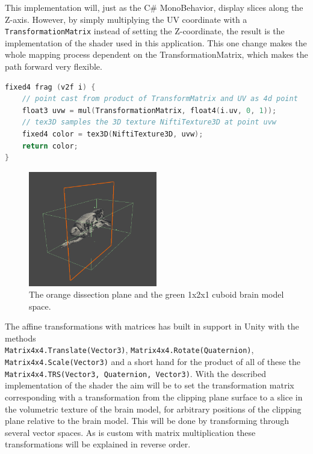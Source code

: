 This implementation will, just as the C\# MonoBehavior, display slices along the Z-axis. However, by simply multiplying the UV coordinate with a \texttt{TransformationMatrix} instead of setting the Z-coordinate, the result is the implementation of the shader used in this application. This one change makes the whole mapping process dependent on the TransformationMatrix, which makes the path forward very flexible.

\begin{lstlisting}[language=c]
fixed4 frag (v2f i) {
    // point cast from product of TransformMatrix and UV as 4d point
    float3 uvw = mul(TransformationMatrix, float4(i.uv, 0, 1));
    // tex3D samples the 3D texture NiftiTexture3D at point uvw
    fixed4 color = tex3D(NiftiTexture3D, uvw);
    return color;
}
\end{lstlisting}
\begin{figure}[ht]
    \centering
    \includegraphics[width=0.5\textwidth]{fig/dissection_boxplaneview.png}
    \caption{The orange dissection plane and the green 1x2x1 cuboid brain model space.}
    \label{fig:boxandplanedissect}
\end{figure}

The affine transformations with matrices has built in support in Unity with the methods\\ \texttt{Matrix4x4.Translate(Vector3)}, \texttt{Matrix4x4.Rotate(Quaternion)}, \texttt{Matrix4x4.Scale(Vector3)} and a short hand for the product of all of these the \texttt{Matrix4x4.TRS(Vector3, Quaternion, Vector3)}. 
With the described implementation of the shader the aim will be to set the transformation matrix corresponding with a transformation from the clipping plane surface to a slice in the volumetric texture of the brain model, for arbitrary positions of the clipping plane relative to the brain model. This will be done by transforming through several vector spaces. As is custom with matrix multiplication these transformations will be explained in reverse order. 

